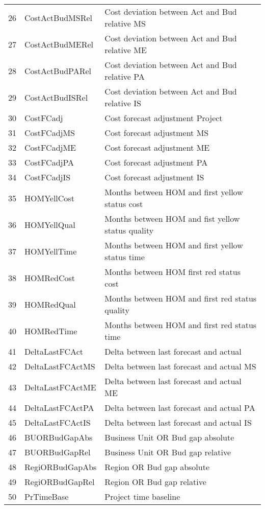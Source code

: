\begin{longtable}[ht]{p{} p{}p{}}
	26    & CostActBudMSRel & Cost deviation between Act and Bud relative MS \\
	27    & CostActBudMERel & Cost deviation between Act and Bud relative ME\\
	28    & CostActBudPARel & Cost deviation between Act and Bud relative PA \\
	29    & CostActBudISRel & Cost deviation between Act and Bud relative IS \\
	30    & CostFCadj & Cost forecast adjustment Project \\
	31    & CostFCadjMS & Cost forecast adjustment MS \\
	32    & CostFCadjME & Cost forecast adjustment ME \\
	33    & CostFCadjPA & Cost forecast adjustment PA \\
	34    & CostFCadjIS & Cost forecast adjustment IS \\
	35    & HOMYellCost & Months between HOM and first yellow status cost \\
	36    & HOMYellQual & Months between HOM and fist yellow status quality \\
	37    & HOMYellTime & Months between HOM and first yellow status time \\
	38    & HOMRedCost & Months between HOM first red status cost \\
	39    & HOMRedQual & Months between HOM and first red status quality \\
	40    & HOMRedTime & Months between HOM and first red status time \\
	41    & DeltaLastFCAct & Delta between last forecast and actual  \\
	42    & DeltaLastFCActMS & Delta between last forecast and actual MS \\
	43    & DeltaLastFCActME & Delta between last forecast and actual ME \\
	44    & DeltaLastFCActPA & Delta between last forecast and actual PA \\
	45    & DeltaLastFCActIS & Delta between last forecast and actual IS \\
	46    & BUORBudGapAbs & Business Unit OR Bud gap absolute \\
	47    & BUORBudGapRel & Business Unit OR Bud gap relative \\
	48    & RegiORBudGapAbs & Region OR Bud gap absolute \\
	49    & RegiORBudGapRel & Region OR Bud gap relative \\
	50    & PrTimeBase & Project time baseline \\

\end{longtable}
